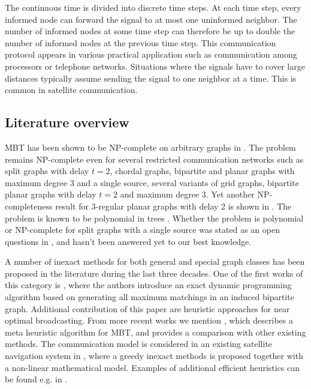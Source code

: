 The continuous time is divided into discrete time steps.
At each time step, every informed node can forward the signal to at most one uninformed neighbor.
The number of informed nodes at some time step can therefore be up to double the number of informed nodes at the previous time step.
This communication protocol appears in various practical application such as communication among processors or telephone networks.
Situations where the signals have to cover large distances typically assume sending the signal to one neighbor at a time.
This is common in satellite communication.

\subsection{Literature overview}

MBT has been shown to be NP-complete on arbitrary graphs in \cite{slater81}. 
The problem remains NP-complete even for several restricted communication networks \cite{jansen95} such as
split graphs with delay $t=2$, chordal graphs,
bipartite and planar graphs with maximum degree 3 and a single source,
several variants of grid graphs,
bipartite planar graphs with delay $t=2$ and maximum degree 3. 
Yet another NP-completeness result for 3-regular planar graphs with delay 2 is shown in \cite{middendorf93}.
The problem is known to be polynomial in trees \cite{slater81}.
Whether the problem is polynomial or NP-complete for split graphs with a single source was stated as an open questions in \cite{jansen95}, and hasn't been answered yet to our best knowledge.

A number of inexact methods for both general and special graph classes has been proposed in the literature during the last three decades.
One of the first works of this category is \cite{scheuermann84}, 
where the authors introduce an exact dynamic programming algorithm based on generating all maximum matchings in an induced bipartite graph.
Additional contribution of this paper are heuristic approaches for near optimal broadcasting.
From more recent works we mention \cite{hasson04}, which describes a meta heuristic algorithm for MBT, and provides a comparison with other existing methods.
The communication model is considered in an existing satellite navigation system in \cite{chu17}, where a greedy inexact methods is proposed together with a non-linear mathematical model.
Examples of additional efficient heuristics can be found e.g. in \cite{harutyunyan06,harutyunyan14,wang10,jimborean13}.

